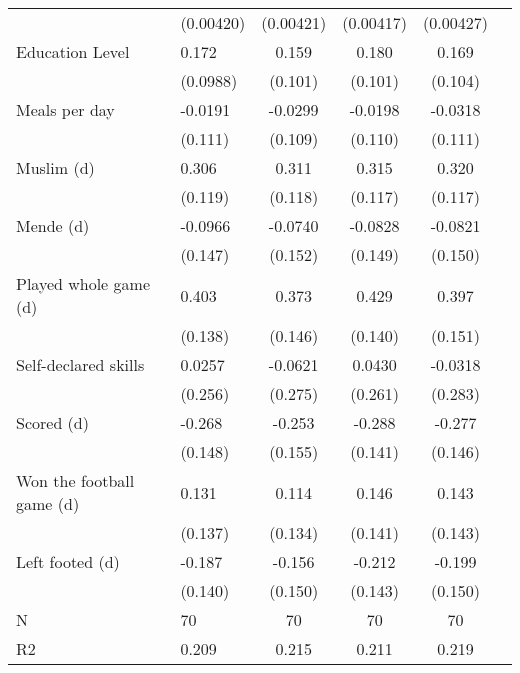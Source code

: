 {\begin{tabularx}{\textwidth}{Xl*{4}{c}}
                    &   (0.00420)         &   (0.00421)         &   (0.00417)         &   (0.00427)         \\
[0.5em]
Education Level     &       0.172\sym{*}  &       0.159         &       0.180\sym{*}  &       0.169         \\
                    &    (0.0988)         &     (0.101)         &     (0.101)         &     (0.104)         \\
[0.5em]
Meals per day       &     -0.0191         &     -0.0299         &     -0.0198         &     -0.0318         \\
                    &     (0.111)         &     (0.109)         &     (0.110)         &     (0.111)         \\
[0.5em]
Muslim (d)          &       0.306\sym{**} &       0.311\sym{***}&       0.315\sym{***}&       0.320\sym{***}\\
                    &     (0.119)         &     (0.118)         &     (0.117)         &     (0.117)         \\
[0.5em]
Mende (d)           &     -0.0966         &     -0.0740         &     -0.0828         &     -0.0821         \\
                    &     (0.147)         &     (0.152)         &     (0.149)         &     (0.150)         \\
[0.5em]
Played whole game (d)&       0.403\sym{***}&       0.373\sym{**} &       0.429\sym{***}&       0.397\sym{***}\\
                    &     (0.138)         &     (0.146)         &     (0.140)         &     (0.151)         \\
[0.5em]
Self-declared skills&      0.0257         &     -0.0621         &      0.0430         &     -0.0318         \\
                    &     (0.256)         &     (0.275)         &     (0.261)         &     (0.283)         \\
[0.5em]
Scored (d)          &      -0.268\sym{*}  &      -0.253         &      -0.288\sym{**} &      -0.277\sym{*}  \\
                    &     (0.148)         &     (0.155)         &     (0.141)         &     (0.146)         \\
[0.5em]
Won the football game (d)&       0.131         &       0.114         &       0.146         &       0.143         \\
                    &     (0.137)         &     (0.134)         &     (0.141)         &     (0.143)         \\
[0.5em]
Left footed (d)     &      -0.187         &      -0.156         &      -0.212         &      -0.199         \\
                    &     (0.140)         &     (0.150)         &     (0.143)         &     (0.150)         \\
\hline
N                   &          70         &          70         &          70         &          70         \\
R2                  &       0.209         &       0.215         &       0.211         &       0.219         \\
\hline\hline
\end{tabularx}
}
